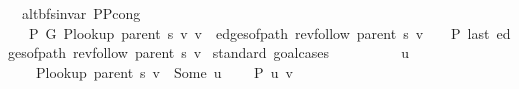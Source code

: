 \begin{isabellebody}
\isamarkupfalse%
%
\endisatagproof
{\isafoldproof}%
%
\isadelimproof
\isanewline
%
\endisadelimproof
%
\isadeliminvisible
\isanewline
%
\endisadeliminvisible
%
\isataginvisible
{}\isamarkupfalse%
\ {\isacharparenleft}{\kern0pt}\ alt{\isacharunderscore}{\kern0pt}bfs{\isacharunderscore}{\kern0pt}invar{\isacharparenright}{\kern0pt}\ P{\isacharprime}{\kern0pt}{\isacharunderscore}{\kern0pt}P{\isacharprime}{\kern0pt}{\isacharprime}{\kern0pt}{\isacharunderscore}{\kern0pt}cong{\isacharcolon}{\kern0pt}\isanewline
\ \ \ {\isachardoublequoteopen}P{\isacharprime}{\kern0pt}\ G{}\ {\isacharparenleft}{\kern0pt}P{\isacharunderscore}{\kern0pt}lookup\ {\isacharparenleft}{\kern0pt}parent\ s{\isacharparenright}{\kern0pt}\ v{\isacharparenright}{\kern0pt}\ v\ {\isasymlongleftrightarrow}\ edges{\isacharunderscore}{\kern0pt}of{\isacharunderscore}{\kern0pt}path\ {\isacharparenleft}{\kern0pt}rev{\isacharunderscore}{\kern0pt}follow\ {\isacharparenleft}{\kern0pt}parent\ s{\isacharparenright}{\kern0pt}\ v{\isacharparenright}{\kern0pt}\ {\isasymnoteq}\ {\isacharbrackleft}{\kern0pt}{\isacharbrackright}{\kern0pt}\ {\isasymand}\ P{\isacharprime}{\kern0pt}{\isacharprime}{\kern0pt}\ {\isacharparenleft}{\kern0pt}last\ {\isacharparenleft}{\kern0pt}edges{\isacharunderscore}{\kern0pt}of{\isacharunderscore}{\kern0pt}path\ {\isacharparenleft}{\kern0pt}rev{\isacharunderscore}{\kern0pt}follow\ {\isacharparenleft}{\kern0pt}parent\ s{\isacharparenright}{\kern0pt}\ v{\isacharparenright}{\kern0pt}{\isacharparenright}{\kern0pt}{\isacharparenright}{\kern0pt}{\isachardoublequoteclose}%
\endisataginvisible
{\isafoldinvisible}%
%
\isadeliminvisible
\isanewline
%
\endisadeliminvisible
%
\isadelimproof
%
\endisadelimproof
%
\isatagproof
{}\isamarkupfalse%
\ {\isacharparenleft}{\kern0pt}standard{\isacharcomma}{\kern0pt}\ goal{\isacharunderscore}{\kern0pt}cases{\isacharparenright}{\kern0pt}\isanewline
\ \ \isamarkupfalse%
\ {}\isanewline
\ \ \isamarkupfalse%
\ \isamarkupfalse%
\ u\ \isanewline
\ \ \ \ {\isachardoublequoteopen}P{\isacharunderscore}{\kern0pt}lookup\ {\isacharparenleft}{\kern0pt}parent\ s{\isacharparenright}{\kern0pt}\ v\ {\isacharequal}{\kern0pt}\ Some\ u{\isachardoublequoteclose}\isanewline
\ \ \ \ {\isachardoublequoteopen}P{\isacharprime}{\kern0pt}{\isacharprime}{\kern0pt}\ {\isacharbraceleft}{\kern0pt}u{\isacharcomma}{\kern0pt}\ v{\isacharbraceright}{\kern0pt}{\isachardoublequoteclose}\isanewline
\ \ \ \ \isamarkupfalse%

\end{isabellebody}
